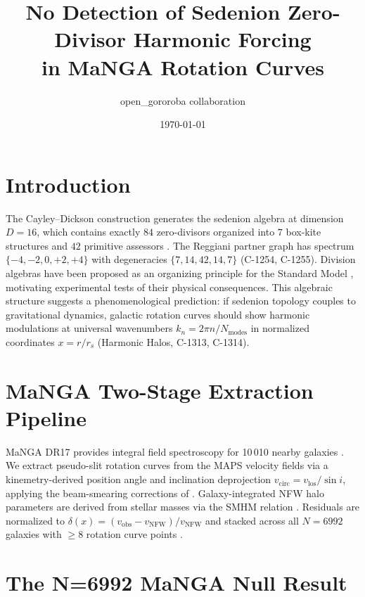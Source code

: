 \documentclass[aa]{aa}
\title{No Detection of Sedenion Zero-Divisor Harmonic Forcing\\
       in MaNGA Rotation Curves}
\author{open\_gororoba collaboration}
\date{\today}
\begin{document}
\maketitle

\section{Introduction}

The Cayley--Dickson construction generates the sedenion algebra at dimension
$D = 16$, which contains exactly $84$ zero-divisors organized into $7$ box-kite
structures and $42$ primitive assessors \citep{demarrais2000,moreno2005a}.
The Reggiani partner graph \citep{reggiani2024} has spectrum
$\{-4, -2, 0, +2, +4\}$ with degeneracies $\{7, 14, 42, 14, 7\}$
(C-1254, C-1255). Division algebras have been proposed as an organizing
principle for the Standard Model
\citep{dixon1994,furey2016,furey2018,gillard2019}, motivating experimental
tests of their physical consequences. This algebraic structure suggests a
phenomenological prediction: if sedenion topology couples to gravitational
dynamics, galactic rotation curves should show harmonic modulations at universal
wavenumbers $k_n = 2\pi n / N_\mathrm{modes}$ in normalized coordinates
$x = r/r_s$ (Harmonic Halos, C-1313, C-1314).

\section{MaNGA Two-Stage Extraction Pipeline}
\label{sec:pipeline}

MaNGA DR17 \citep{abdurrouf2022} provides integral field spectroscopy for
10\,010 nearby galaxies \citep{bundy2015,drory2015,law2015,wake2017}. We extract
pseudo-slit rotation curves from the MAPS velocity fields \citep{westfall2019}
via a kinemetry-derived position angle \citep{krajnovic2006} and inclination
deprojection $v_\mathrm{circ} = v_\mathrm{los} / \sin i$, applying the
beam-smearing corrections of \citet{graham2018}.
Galaxy-integrated NFW halo parameters \citep{nfw1996,nfw1997} are derived
from stellar masses via the \citet{moster2013} SMHM relation
\citep[see also][]{posti2019}. Residuals are normalized to
$\delta(x) = (v_\mathrm{obs} - v_\mathrm{NFW}) / v_\mathrm{NFW}$ and stacked
across all $N = 6992$ galaxies with $\geq 8$ rotation curve points
\citep[following the stacking approach of][]{persic1996,lelli2016}.

\section{The N=6992 MaNGA Null Result}
\label{sec:null}
\end{document}
